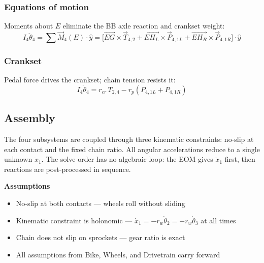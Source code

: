 \documentclass[10pt]{extarticle}
\numberwithin{equation}{subsubsection}
\begin{document}
\subsubsection{Equations of motion}

Moments about $E$ eliminate the BB axle reaction and crankset weight:
\begin{equation}
    I_4\ddot{\theta}_4 = \sum \vec{M}_4(E)\cdot\hat{y}
        = \bigl[\vec{EG}\times\vec{T}_{4,2}
          + \vec{EH_L}\times\vec{P}_{4,1L}
          + \vec{EH_R}\times\vec{P}_{4,1R}\bigr]\cdot\hat{y}
\end{equation}

\subsubsection{Crankset}

Pedal force drives the crankset; chain tension resists it:
\begin{equation}
    I_4\ddot{\theta}_4 = r_{cr}\,T_{2,4} - r_p\left(P_{4,1L} + P_{4,1R}\right)
\end{equation}

\newpage
\subsection{Assembly}

The four subsystems are coupled through three kinematic constraints: no-slip at each contact and the fixed chain ratio. All angular accelerations reduce to a single unknown $\ddot{x}_1$. The solve order has no algebraic loop: the EOM gives $\ddot{x}_1$ first, then reactions are post-processed in sequence.

\textbf{Assumptions}
\begin{itemize}
    \item No-slip at both contacts --- wheels roll without sliding
    \item Kinematic constraint is holonomic --- $\dot{x}_1 = -r_w\dot{\theta}_2 = -r_w\dot{\theta}_3$ at all times
    \item Chain does not slip on sprockets --- gear ratio is exact
    \item All assumptions from Bike, Wheels, and Drivetrain carry forward
\end{itemize}
\end{document}
